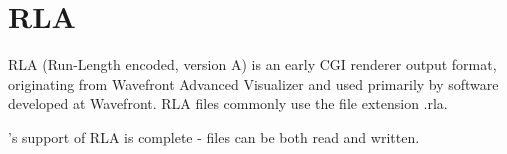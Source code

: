\vspace{.25in}

\section{RLA}
\label{sec:bundledplugins:rla}

RLA (Run-Length encoded, version A) is an early CGI renderer output format,
originating from Wavefront Advanced Visualizer and used primarily by software
developed at Wavefront.  RLA files commonly use the file extension {\cf .rla}.

\product's support of RLA is complete - files can be both read and written.

\vspace{.125in}

